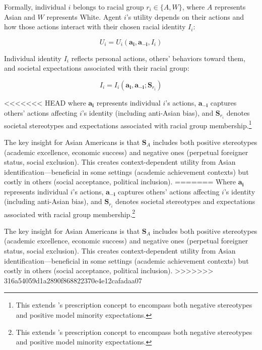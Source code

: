 Formally, individual $i$ belongs to racial group $r_i \in \{A, W\}$, where $A$ represents Asian and $W$ represents White. Agent $i$'s utility depends on their actions and how those actions interact with their chosen racial identity $I_i$:

\begin{equation}
U_i = U_i(\pmb{a_i}, \pmb{a_{-i}}, I_i)\label{eq:util}
\end{equation}

Individual identity $I_i$ reflects personal actions, others' behaviors toward them, and societal expectations associated with their racial group:

\begin{equation}
I_i = I_i(\pmb{a_i}, \pmb{a_{-i}}; \pmb{S}_{r_{i}})\label{eq:identity}
\end{equation}

<<<<<<< HEAD
where $\pmb{a_i}$ represents individual $i$'s actions, $\pmb{a_{-i}}$ captures others' actions affecting $i$'s identity (including anti-Asian bias), and $\pmb{S}_{r_{i}}$ denotes societal stereotypes and expectations associated with racial group membership.\footnote{This extends \textcite{akerlofEconomicsIdentity2000}'s prescription concept to encompass both negative stereotypes and positive model minority expectations.}

The key insight for Asian Americans is that $\pmb{S}_{A}$ includes both positive stereotypes (academic excellence, economic success) and negative ones (perpetual foreigner status, social exclusion). This creates context-dependent utility from Asian identification---beneficial in some settings (academic achievement contexts) but costly in others (social acceptance, political inclusion).
=======
Where $\pmb{a_i}$ represents individual $i$'s actions, $\pmb{a_{-i}}$ captures others' actions affecting $i$'s identity (including anti-Asian bias), and $\pmb{S}_{r_{i}}$ denotes societal stereotypes and expectations associated with racial group membership.\footnote{This extends \textcite{akerlofEconomicsIdentity2000}'s prescription concept to encompass both negative stereotypes and positive model minority expectations.}

The key insight for Asian Americans is that $\pmb{S}_{A}$ includes both positive stereotypes (academic excellence, economic success) and negative ones (perpetual foreigner status, social exclusion). This creates context-dependent utility from Asian identification—beneficial in some settings (academic achievement contexts) but costly in others (social acceptance, political inclusion).
>>>>>>> 316a54059d1a2890f868822370e4e12cafadaa07

